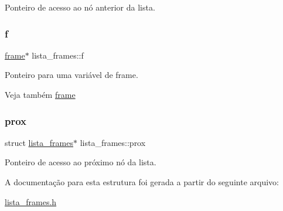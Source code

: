 Ponteiro de acesso ao nó anterior da lista. \mbox{\label{structlista__frames_ad7777179f480ab04a686cf8edf19addf}} 
\subsubsection{\texorpdfstring{f}{f}}
{\footnotesize\ttfamily \hyperlink{structframe}{frame}$\ast$ lista\+\_\+frames\+::f}

Ponteiro para uma variável de frame. \begin{DoxySeeAlso}{Veja também}
\hyperlink{structframe}{frame} 
\end{DoxySeeAlso}
\mbox{\label{structlista__frames_ac33c75b9e66a517b493e6d35a3c1efb3}} 
\subsubsection{\texorpdfstring{prox}{prox}}
{\footnotesize\ttfamily struct \hyperlink{structlista__frames}{lista\+\_\+frames}$\ast$ lista\+\_\+frames\+::prox}

Ponteiro de acesso ao próximo nó da lista. 

A documentação para esta estrutura foi gerada a partir do seguinte arquivo\+:\begin{DoxyCompactItemize}
\item 
\hyperlink{lista__frames_8h}{lista\+\_\+frames.\+h}\end{DoxyCompactItemize}

